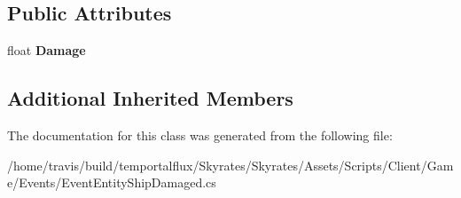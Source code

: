 \subsection*{Public Attributes}
\begin{DoxyCompactItemize}
\item 
\hypertarget{class_skyrates_1_1_client_1_1_game_1_1_event_1_1_event_entity_ship_damaged_a1e4d02b92dcb9e8b957e70c7857d96d7}{float {\bfseries Damage}}\label{class_skyrates_1_1_client_1_1_game_1_1_event_1_1_event_entity_ship_damaged_a1e4d02b92dcb9e8b957e70c7857d96d7}

\end{DoxyCompactItemize}
\subsection*{Additional Inherited Members}


The documentation for this class was generated from the following file\-:\begin{DoxyCompactItemize}
\item 
/home/travis/build/temportalflux/\-Skyrates/\-Skyrates/\-Assets/\-Scripts/\-Client/\-Game/\-Events/Event\-Entity\-Ship\-Damaged.\-cs\end{DoxyCompactItemize}
